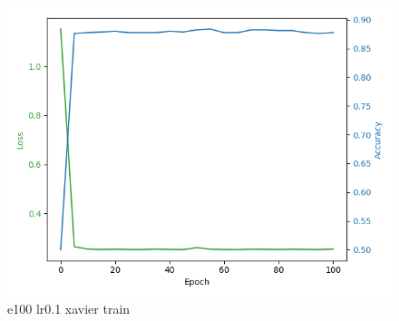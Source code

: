 \documentclass[8pt]{article}
\begin{document}
\begin{figure}[H]
\begin{minipage}{0.32\textwidth}
    \end{minipage}
    \begin{minipage}{0.32\textwidth}
        \centering
        \includegraphics[width=\textwidth]{../Prob4/out/1024_173617/e100_lr0.1_btz16_xavier/training_process.png}
        \caption{e100 lr0.1 xavier train}
        \label{fig:e100 lr0.1 xavier train}
    \end{minipage}
\end{figure}
\end{document}

